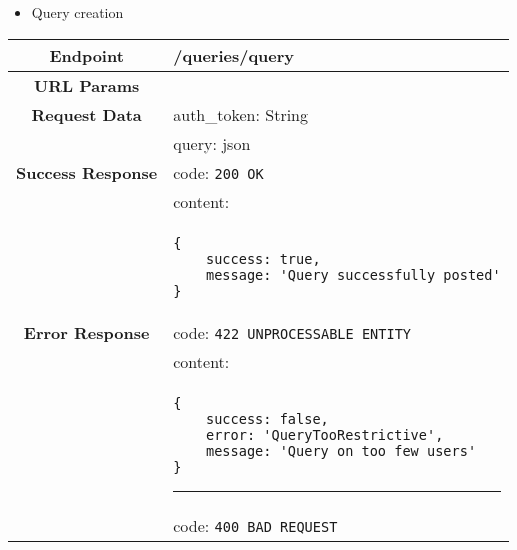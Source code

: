     \begin{itemize}
        \item Query creation
    \end{itemize}
    \begin{adjustwidth}{1cm}{}
        \begin{longtable}{|c|l|}
            \hline
            \textbf{Endpoint} & /queries/query \\
            \hline
            \textbf{URL Params} &  \\
            \hline
            \textbf{Request Data} & auth\_token: String \\
            &                 query: json \\
            \hline
            \textbf{Success Response} & code: \texttt{200 OK} \\
            &                           content: \\
            & \begin{minipage}[t]{0.5\textwidth}
                \begin{adjustwidth}{1.5cm}{}
                \begin{verbatim}
{
    success: true, 
	message: 'Query successfully posted'
}
                \end{verbatim}
                \end{adjustwidth}
              \end{minipage} \\
              \hline
            \textbf{Error Response} & code: \texttt{422 UNPROCESSABLE ENTITY} \\
            &                         content: \\
            & \begin{minipage}[t]{0.7\textwidth}
                \begin{adjustwidth}{1.5cm}{}
                \begin{verbatim}
{
    success: false, 
    error: 'QueryTooRestrictive',
    message: 'Query on too few users'
}
                \end{verbatim}
                \end{adjustwidth}
                \par\noindent\rule{\textwidth}{1pt}
                 \vspace{4pt}
              \end{minipage} \\
              &                     code: \texttt{400 BAD REQUEST} \\

\end{longtable}
\end{adjustwidth}
